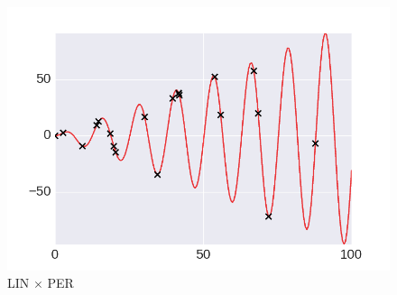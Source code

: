     \begin{subfigure}[b]{0.3\textwidth}
        \includegraphics[width=\textwidth]{figs/composition/composition_demo_LINxPER.png}
        \caption{LIN $\times$ PER}
    \end{subfigure}

